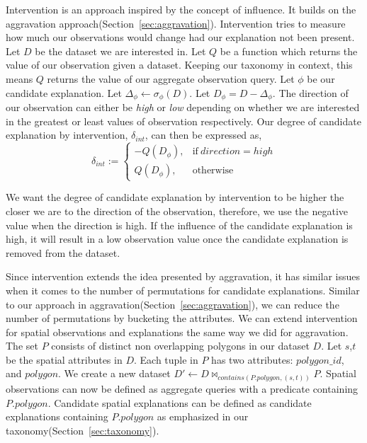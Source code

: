 Intervention is an approach inspired by the concept of influence. It builds on the aggravation approach(Section~\ref{sec:aggravation}). Intervention tries to measure how much our observations would change had our explanation not been present. Let $D$ be the dataset we are interested in. Let $Q$ be a function which returns the value of our observation given a dataset. Keeping our taxonomy in context, this means $Q$ returns the value of our aggregate observation query. Let $\phi$ be our candidate explanation. Let $\Delta_\phi \leftarrow \sigma_\phi(D)$. Let $D_\phi = D - \Delta_\phi$. The direction of our observation can either be \textit{high} or \textit{low} depending on whether we are interested in the greatest or least values of observation respectively. Our degree of candidate explanation by intervention, $\delta_{int}$, can then be expressed as,
\begin{equation}
\delta_{int}:=
    \begin{cases}
        -Q(D_\phi), & \text{if}\ direction=high \\
        Q(D_\phi), & \text{otherwise}
    \end{cases}
\end{equation}

We want the degree of candidate explanation by intervention to be higher the closer we are to the direction of the observation, therefore, we use the negative value when the direction is high. If the influence of the candidate explanation is high, it will result in a low observation value once the candidate explanation is removed from the dataset.

Since intervention extends the idea presented by aggravation, it has similar issues when it comes to the number of permutations for candidate explanations. Similar to our approach in aggravation(Section~\ref{sec:aggravation}), we can reduce the number of permutations by bucketing the attributes. We can extend intervention for spatial observations and explanations the same way we did for aggravation. The set $P$ consists of distinct non overlapping polygons in our dataset $D$. Let $s$,$t$ be the spatial attributes in $D$. Each tuple in $P$ has two attributes: $polygon\_id$, and $polygon$. We create a new dataset
$D' \leftarrow D \bowtie_{contains(P.polygon,(s,t))} P$. Spatial observations can now be defined as aggregate queries with a predicate containing $P.polygon$. Candidate spatial explanations can be defined as candidate explanations containing $P.polygon$ as emphasized in our taxonomy(Section~\ref{sec:taxonomy}).

